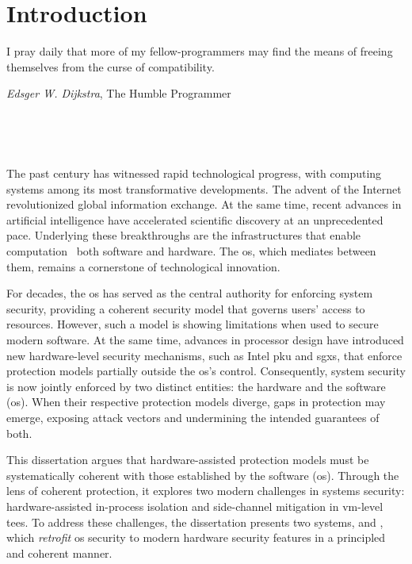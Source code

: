 \chapter{Introduction} \label{chap:intro}


\epigraph{
	I pray daily that more of my fellow-programmers may find the means of freeing themselves from the curse of compatibility.
}{\textit{Edsger W. Dijkstra}, The Humble Programmer}

\

\


The past century has witnessed rapid technological progress, with computing systems among its most transformative developments.
The advent of the Internet revolutionized global information exchange. At the same time, recent advances in artificial intelligence have accelerated scientific discovery at an unprecedented pace.
Underlying these breakthroughs are the infrastructures that enable computation \dash\ both software and hardware.
The \gls{os}, which mediates between them, remains a cornerstone of technological innovation.

For decades, the \gls{os} has served as the central authority for enforcing system security, providing a coherent security model that governs users' access to resources.
However, such a model is showing limitations when used to secure modern software.
At the same time, advances in processor design have introduced new hardware-level security mechanisms, such as Intel \gls{pku} and \glspl{sgx}, that enforce protection models partially outside the \gls{os}'s control.
Consequently, system security is now jointly enforced by two distinct entities: the hardware and the software (\gls{os}).
When their respective protection models diverge, gaps in protection may emerge, exposing attack vectors and undermining the intended guarantees of both.

This dissertation argues that hardware-assisted protection models must be systematically coherent with those established by the software (\gls{os}).
Through the lens of coherent protection, it explores two modern challenges in systems security: hardware-assisted in-process isolation and side-channel mitigation in \gls{vm}-level \glspl{tee}.
To address these challenges, the dissertation presents two systems, \capacity and \incognitos, which \emph{retrofit} \gls{os} security to modern hardware security features in a principled and coherent manner.

